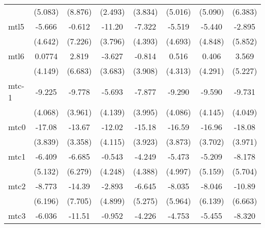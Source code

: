 \documentclass{article}
\begin{document}
{\begin{longtable}{l*{7}{c}}
                &  (5.083)         &  (8.876)         &  (2.493)         &  (3.834)         &  (5.016)         &  (5.090)         &  (6.383)         \\
mtl5            &   -5.666         &   -0.612         &   -11.20\sym{**} &   -7.322         &   -5.519         &   -5.440         &   -2.895         \\
                &  (4.642)         &  (7.226)         &  (3.796)         &  (4.393)         &  (4.693)         &  (4.848)         &  (5.852)         \\
mtl6            &   0.0774         &    2.819         &   -3.627         &   -0.814         &    0.516         &    0.406         &    3.569         \\
                &  (4.149)         &  (6.683)         &  (3.683)         &  (3.908)         &  (4.313)         &  (4.291)         &  (5.227)         \\
mtc-1           &   -9.225\sym{*}  &   -9.778\sym{*}  &   -5.693         &   -7.877         &   -9.290\sym{*}  &   -9.590\sym{*}  &   -9.731\sym{*}  \\
                &  (4.068)         &  (3.961)         &  (4.139)         &  (3.995)         &  (4.086)         &  (4.145)         &  (4.049)         \\
mtc0            &   -17.08\sym{***}&   -13.67\sym{***}&   -12.02\sym{**} &   -15.18\sym{***}&   -16.59\sym{***}&   -16.96\sym{***}&   -18.08\sym{***}\\
                &  (3.839)         &  (3.358)         &  (4.115)         &  (3.923)         &  (3.873)         &  (3.702)         &  (3.971)         \\
mtc1            &   -6.409         &   -6.685         &   -0.543         &   -4.249         &   -5.473         &   -5.209         &   -8.178         \\
                &  (5.132)         &  (6.279)         &  (4.248)         &  (4.388)         &  (4.997)         &  (5.159)         &  (5.704)         \\
mtc2            &   -8.773         &   -14.39         &   -2.893         &   -6.645         &   -8.035         &   -8.046         &   -10.89         \\
                &  (6.196)         &  (7.705)         &  (4.899)         &  (5.275)         &  (5.964)         &  (6.139)         &  (6.663)         \\
mtc3            &   -6.036         &   -11.51         &   -0.952         &   -4.226         &   -4.753         &   -5.455         &   -8.320         \\

\end{longtable}}
\end{document}

